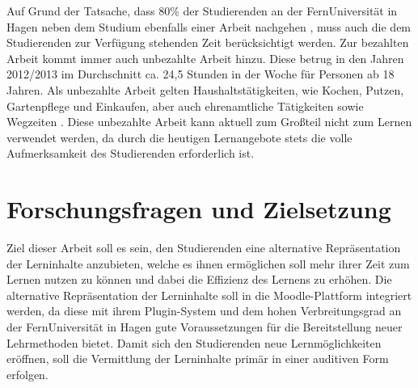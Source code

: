 Auf Grund der Tatsache, dass 80\% der Studierenden an der FernUniversität in Hagen neben dem Studium ebenfalls einer Arbeit nachgehen \citep{fernuniversitaet2018stat}, muss auch die dem Studierenden zur Verfügung stehenden Zeit berücksichtigt werden. Zur bezahlten Arbeit kommt immer auch unbezahlte Arbeit hinzu. Diese betrug in den Jahren 2012/2013 im Durchschnitt ca. 24,5 Stunden in der Woche für Personen ab 18 Jahren. Als unbezahlte Arbeit gelten Haushaltstätigkeiten, wie Kochen, Putzen, Gartenpflege und Einkaufen, aber auch ehrenamtliche Tätigkeiten sowie Wegzeiten \citep{destatis2015zeit}. Diese unbezahlte Arbeit kann aktuell zum Großteil nicht zum Lernen verwendet werden, da durch die heutigen Lernangebote stets die volle Aufmerksamkeit des Studierenden erforderlich ist.



\section{Forschungsfragen und Zielsetzung}
Ziel dieser Arbeit soll es sein, den Studierenden eine alternative Repräsentation der Lerninhalte anzubieten, welche es ihnen ermöglichen soll mehr ihrer Zeit zum Lernen nutzen zu können und dabei die Effizienz des Lernens zu erhöhen. Die alternative Repräsentation der Lerninhalte soll in die Moodle-Plattform integriert werden, da diese mit ihrem Plugin-System und dem hohen Verbreitungsgrad an der FernUniversität in Hagen gute Voraussetzungen für die Bereitstellung neuer Lehrmethoden bietet. Damit sich den Studierenden neue Lernmöglichkeiten eröffnen, soll die Vermittlung der Lerninhalte primär in einer auditiven Form erfolgen.

